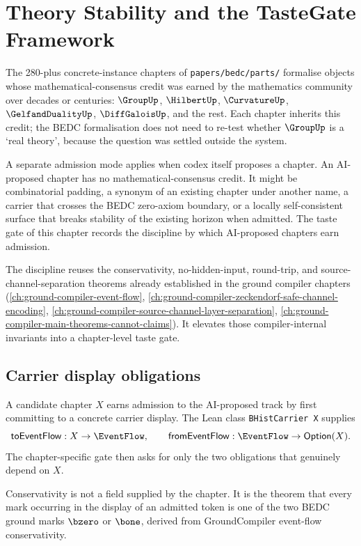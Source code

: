 \chapter{Theory Stability and the TasteGate Framework}
\label{ch:visions-theory-stability-taste-gate}

The 280-plus concrete-instance chapters of \texttt{papers/bedc/parts/}
formalise objects whose mathematical-consensus credit was earned by the
mathematics community over decades or centuries: $\GroupUp$, $\HilbertUp$,
$\CurvatureUp$, $\GelfandDualityUp$, $\DiffGaloisUp$, and the rest. Each
chapter inherits this credit; the BEDC formalisation does not need to
re-test whether $\GroupUp$ is a `real theory', because the question was
settled outside the system.

A separate admission mode applies when codex itself proposes a chapter. An
AI-proposed chapter has no mathematical-consensus credit. It might be
combinatorial padding, a synonym of an existing chapter under another name, a
carrier that crosses the BEDC zero-axiom boundary, or a locally self-consistent
surface that breaks stability of the existing horizon when admitted. The taste
gate of this chapter records the discipline by which AI-proposed chapters earn
admission.

The discipline reuses the conservativity, no-hidden-input, round-trip,
and source-channel-separation theorems already established in the
ground compiler chapters
(\autoref{ch:ground-compiler-event-flow},
 \autoref{ch:ground-compiler-zeckendorf-safe-channel-encoding},
 \autoref{ch:ground-compiler-source-channel-layer-separation},
 \autoref{ch:ground-compiler-main-theorems-cannot-claims}). It elevates
those compiler-internal invariants into a chapter-level taste gate.

\section{Carrier display obligations}
\label{sec:taste-gate-four-obligations}

A candidate chapter $X$ earns admission to the AI-proposed track by first
committing to a concrete carrier display. The Lean class
\texttt{BHistCarrier X} supplies
$$
\mathsf{toEventFlow}:X\to\EventFlow,
\qquad
\mathsf{fromEventFlow}:\EventFlow\to\mathsf{Option}(X).
$$
The chapter-specific gate then asks for only the two obligations that genuinely
depend on $X$.

\begin{definition}
\label{def:taste-gate-conservativity}
Conservativity is not a field supplied by the chapter. It is the theorem that
every mark occurring in the display of an admitted token is one of the two BEDC
ground marks $\bzero$ or $\bone$, derived from GroundCompiler event-flow
conservativity.
\end{definition}

